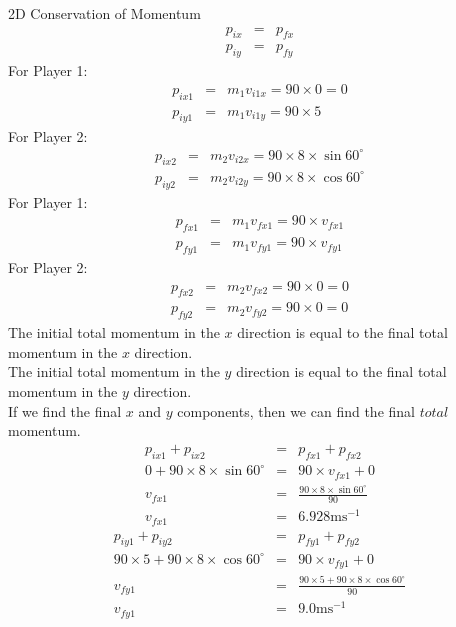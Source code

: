 \begin{wex}{2D Conservation of Momentum}
{\begin{eqnarray*}
p_{ix} &=& p_{fx}\\
p_{iy} &=& p_{fy}
\end{eqnarray*}
For Player 1:
\begin{eqnarray*}
p_{ix1} &=& m_{1}v_{i1x} = 90 \times 0 = 0 \\
p_{iy1} &=& m_{1}v_{i1y} = 90 \times 5 
\end{eqnarray*}
For Player 2:
\begin{eqnarray*}
p_{ix2} &=& m_{2}v_{i2x} = 90 \times 8\times \sin{60^{\circ}} \\
p_{iy2} &=& m_{2}v_{i2y} = 90 \times 8\times \cos{60^{\circ}} 
\end{eqnarray*}
For Player 1:
\begin{eqnarray*}
p_{fx1} &=& m_{1}v_{fx1} = 90 \times v_{fx1}\\
p_{fy1} &=& m_{1}v_{fy1} = 90 \times v_{fy1}
\end{eqnarray*}
For Player 2:
\begin{eqnarray*}
p_{fx2} &=& m_{2}v_{fx2} = 90 \times 0 = 0 \\
p_{fy2} &=& m_{2}v_{fy2} = 90 \times 0 = 0
\end{eqnarray*}
The initial total momentum in the $x$ direction is equal to the final total momentum in the $x$ direction.\\
The initial total momentum in the $y$ direction is equal to the final total momentum in the $y$ direction.\\
If we find the final $x$ and $y$ components, then we can find the final $total$ momentum.
\begin{eqnarray*}
p_{ix1} + p_{ix2} &=& p_{fx1} + p_{fx2} \\
0 + 90 \times 8\times \sin{60^{\circ}} &=& 90 \times v_{fx1} + 0 \\
v_{fx1} &=& \frac{90 \times 8\times \sin{60^{\circ}} }{90} \\
v_{fx1} &=& 6.928 \text{ms}^{-1}
\end{eqnarray*}
\begin{eqnarray*}
p_{iy1} + p_{iy2} &=& p_{fy1} + p_{fy2} \\
90\times 5 + 90\times 8\times \cos{60^{\circ}} &=& 90\times v_{fy1} + 0 \\
v_{fy1} &=& \frac{90\times 5 + 90\times 8\times \cos{60^{\circ}}}{90} \\
v_{fy1} &=& 9.0 \text{ms}^{-1}
\end{eqnarray*}
}
\end{wex}

